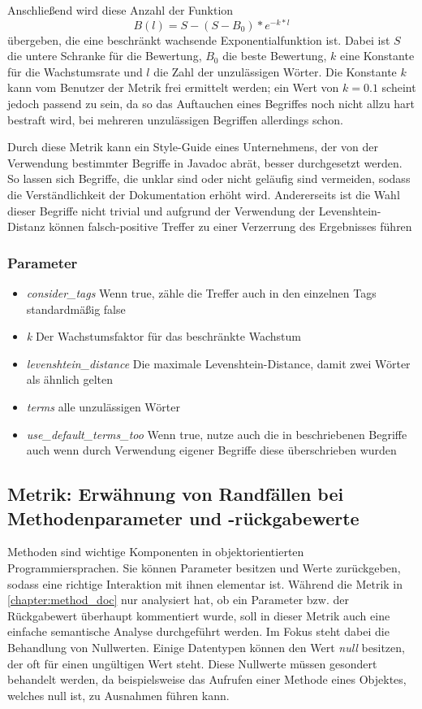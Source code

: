 Anschließend wird diese Anzahl der Funktion
\begin{equation}
     B(l)=S-(S-B_0)*e^{-k*l}
 \end{equation} übergeben, die eine beschränkt wachsende Exponentialfunktion ist. Dabei ist $S$ die untere Schranke für die Bewertung, $B_0$ die beste Bewertung,  $k$ eine Konstante für die Wachstumsrate und $l$ die Zahl der unzulässigen Wörter. 
  Die Konstante $k$ kann vom Benutzer der Metrik frei ermittelt werden; ein Wert von $k=0.1$ scheint jedoch passend zu sein, da so das Auftauchen eines Begriffes noch nicht allzu hart bestraft wird, bei mehreren unzulässigen Begriffen allerdings schon.
  
  Durch diese Metrik kann ein Style-Guide eines Unternehmens, der von der Verwendung bestimmter Begriffe in Javadoc abrät, besser durchgesetzt werden. So lassen sich Begriffe, die unklar sind oder nicht geläufig sind vermeiden, sodass die Verständlichkeit der Dokumentation erhöht wird. Andererseits ist die Wahl dieser Begriffe nicht trivial und aufgrund der Verwendung der Levenshtein-Distanz können falsch-positive Treffer zu einer Verzerrung des Ergebnisses führen
  \subsubsection{Parameter}
\begin{itemize}
    \item \textit{consider\_tags} Wenn true, zähle die Treffer auch in den einzelnen Tags standardmäßig false
    \item \textit{k} Der Wachstumsfaktor für das beschränkte Wachstum
    \item \textit{levenshtein\_distance} Die maximale Levenshtein-Distance, damit zwei Wörter als ähnlich gelten
    \item \textit{terms} alle unzulässigen Wörter
    \item \textit{use\_default\_terms\_too} Wenn true, nutze auch die in \cite{HowtoWriteDocCommentsfortheJavadocTool} beschriebenen Begriffe auch wenn durch Verwendung eigener Begriffe diese überschrieben wurden
\end{itemize}
 \subsection{Metrik: Erwähnung von Randfällen bei Methodenparameter und -rückgabewerte}
 Methoden sind wichtige Komponenten in objektorientierten Programmiersprachen. Sie können Parameter besitzen und Werte zurückgeben, sodass eine richtige Interaktion mit ihnen elementar ist. Während die Metrik in \ref{chapter:method_doc} nur analysiert hat, ob ein Parameter bzw. der Rückgabewert überhaupt kommentiert wurde, soll in dieser Metrik auch eine einfache semantische Analyse durchgeführt werden. Im Fokus steht dabei die Behandlung von Nullwerten. Einige Datentypen können den Wert \textit{null} besitzen, der oft für einen ungültigen Wert steht. Diese Nullwerte müssen gesondert behandelt werden, da beispielsweise das Aufrufen einer Methode eines Objektes, welches null ist, zu Ausnahmen führen kann.
 
